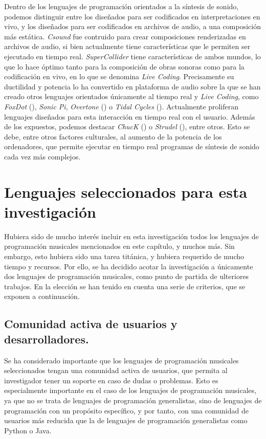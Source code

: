 Dentro de los lenguajes de programación orientados a la síntesis de sonido, podemos distinguir entre los diseñados para ser codificados en interpretaciones en vivo, y los diseñados para ser codificados en archivos de audio, a una composición más estática. \textit{Csound} \citep{boulangerCsoundBookPerspectives2000} fue contruido para crear composiciones renderizadas en archivos de audio, si bien actualmente tiene características que le permiten ser ejecutado en tiempo real. \textit{SuperCollider} \citep{wilsonSuperColliderBook2011a} tiene características de ambos mundos, lo que lo hace óptimo tanto para la composición de obras sonoras como para la codificación en vivo, en lo que se denomina \textit{Live Coding}. Precisamente su ductilidad y potencia lo ha convertido en plataforma de audio sobre la que se han creado otros lenguajes orientados únicamente al tiempo real y \textit{Live Coding}, como \textit{FoxDot} (\citeyear{kirkbrideQirkyFoxDot2023}), \textit{Sonic Pi}, \textit{Overtone} (\citeyear{OvertoneCollaborativeProgrammable}) o \textit{Tidal Cycles} (\citeyear{LiveCodeTidal}). Actualmente proliferan lenguajes diseñados para esta interacción en tiempo real con el usuario. Además de los expuestos, podemos destacar \textit{ChucK} (\citeyear{teamChucKStronglyTimedMusic}) o \textit{Strudel} (\citeyear{StrudelREPL}), entre otros. Esto se debe, entre otros factores culturales, al aumento de la potencia de los ordenadores, que permite ejecutar en tiempo real programas de síntesis de sonido cada vez más complejos.

\section{Lenguajes seleccionados para esta investigación}

Hubiera sido de mucho interés incluir en esta investigación todos los lenguajes de programación musicales mencionados en este capítulo, y muchos más. Sin embargo, esto hubiera sido una tarea titánica, y hubiera requerido de mucho tiempo y recursos. Por ello, se ha decidido acotar la investigación a únicamente dos lenguajes de programación musicales, como punto de partida de ulteriores trabajos. En la elección se han tenido en cuenta una serie de criterios, que se exponen a continuación.


\subsection{Comunidad activa de usuarios y desarrolladores.} Se ha considerado importante que los lenguajes de programación musicales seleccionados tengan una comunidad activa de usuarios, que permita al investigador tener un soporte en caso de dudas o problemas. Esto es especialmente importante en el caso de los lenguajes de programación musicales, ya que no se trata de lenguajes de programación generalistas, sino de lenguajes de programación con un propósito específico, y por tanto, con una comunidad de usuarios más reducida que la de lenguajes de programación generalistas como Python o Java.

